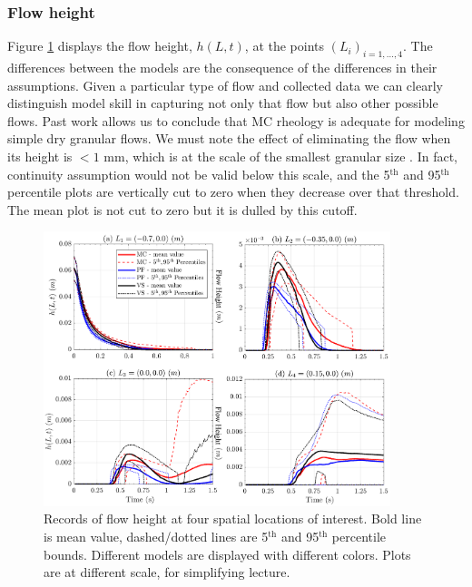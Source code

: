 \documentclass{article}
\begin{document}
\subsubsection{Flow height}
Figure \ref{fig:Ramp-H} displays the flow height, $h(L,t)$, at the points $(L_i)_{i=1,\dots,4}$. The differences between the models are the consequence of the differences in their assumptions. Given a particular type of flow and collected data we can clearly distinguish model skill in capturing not only that flow but also other possible flows. Past work \cite{Webb2004} allows us to conclude that MC rheology is adequate for modeling simple dry granular flows. We must note the effect of eliminating the flow when its height is $<1$ mm, which is at the scale of the smallest granular size \citep{Aghakhani2016}. In fact, continuity assumption would not be valid below this scale, and the 5$^{\mathrm{th}}$ and 95$^{\mathrm{th}}$ percentile plots are vertically cut to zero when they decrease over that threshold. The mean plot is not cut to zero but it is dulled by this cutoff.
\begin{figure}[H]
         \centering
        \includegraphics[width=0.9\textwidth]{InclinedPlane/LocalMeasurments/Height.png}
        \caption{Records of flow height at four spatial locations of interest. Bold line is mean value, dashed/dotted lines are 5$^{\mathrm{th}}$ and 95$^{\mathrm{th}}$ percentile bounds. Different models are displayed with different colors. Plots are at different scale, for simplifying lecture.}
        \label{fig:Ramp-H}
\end{figure}
\end{document}
